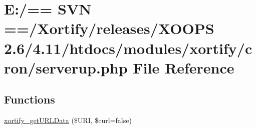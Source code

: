 \hypertarget{serverup_8php}{\section{E\-:/== S\-V\-N ==/\-Xortify/releases/\-X\-O\-O\-P\-S 2.6/4.11/htdocs/modules/xortify/cron/serverup.php File Reference}
\label{serverup_8php}
}
\subsection*{Functions}
\begin{DoxyCompactItemize}
\item 
\hyperlink{serverup_8php_ab3bee0b0adc9956c66ef9b6bf2d54213}{xortify\-\_\-get\-U\-R\-L\-Data} (\$U\-R\-I, \$curl=false)
\end{DoxyCompactItemize}

